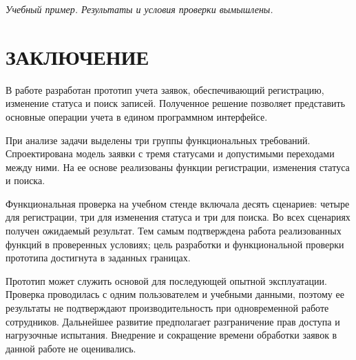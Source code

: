 \documentclass[a4paper,14pt]{extarticle}
\begin{document}
\noindent\textit{Учебный пример. Результаты и условия проверки вымышлены.}
\tableofcontents
\clearpage
\section*{\centering\normalsize ЗАКЛЮЧЕНИЕ}
В работе разработан прототип учета заявок, обеспечивающий регистрацию,
изменение статуса и поиск записей. Полученное решение позволяет представить
основные операции учета в едином программном интерфейсе.

При анализе задачи выделены три группы функциональных требований.
Спроектирована модель заявки с тремя статусами и допустимыми переходами между ними.
На ее основе реализованы функции регистрации, изменения статуса и поиска.

Функциональная проверка на учебном стенде включала десять сценариев:
четыре для регистрации, три для изменения статуса и три для поиска.
Во всех сценариях получен ожидаемый результат. Тем самым подтверждена работа
реализованных функций в проверенных условиях; цель разработки и функциональной
проверки прототипа достигнута в заданных границах.

Прототип может служить основой для последующей опытной эксплуатации.
Проверка проводилась с одним пользователем и учебными данными, поэтому ее результаты
не подтверждают производительность при одновременной работе сотрудников.
Дальнейшее развитие предполагает разграничение прав доступа и нагрузочные испытания.
Внедрение и сокращение времени обработки заявок в данной работе не оценивались.
\end{document}
